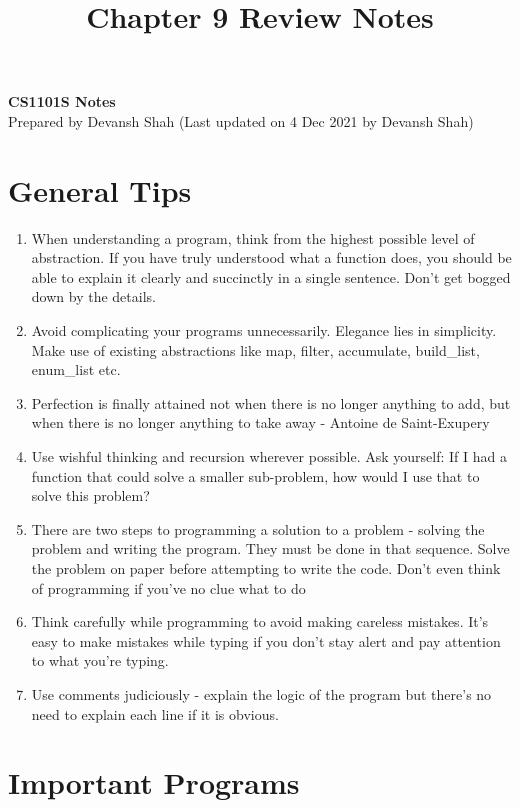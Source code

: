 \documentclass[11pt]{article}
\theoremstyle{definition}
\begin{document}
\renewcommand{\labelenumii}{\arabic{enumi}.\arabic{enumii}}
\renewcommand{\labelenumiii}{\arabic{enumi}.\arabic{enumii}.\arabic{enumiii}}
\renewcommand{\labelenumiv}{\arabic{enumi}.\arabic{enumii}.\arabic{enumiii}.\arabic{enumiv}}
\setcounter{section}{0}
\title{Chapter 9 Review Notes}
\newcommand{\code}{\fontfamily{pcr}\selectfont}
\thispagestyle{empty}

\begin{center}
{\LARGE \bf CS1101S Notes}\\
Prepared by Devansh Shah (Last updated on 4 Dec 2021 by Devansh Shah)
\end{center}
\section{General Tips}
\begin{enumerate}
    \item When understanding a program, think from the highest possible level of abstraction. If you have truly understood what a function does, you should be able to explain it clearly and succinctly in a single sentence. Don't get bogged down by the details.
    \item Avoid complicating your programs unnecessarily. Elegance lies in simplicity. Make use of existing abstractions like map, filter, accumulate, build\_list, enum\_list etc.
    \item Perfection is finally attained not when there is no longer anything to add, but when there is no longer anything to take away - Antoine de Saint-Exupery
    \item Use wishful thinking and recursion wherever possible. Ask yourself: If I had a function that could solve a smaller sub-problem, how would I use that to solve this problem?
    \item There are two steps to programming a solution to a problem - solving the problem and writing the program. They must be done in that sequence. Solve the problem on paper before attempting to write the code. Don't even think of programming if you've no clue what to do
    \item Think carefully while programming to avoid making careless mistakes. It's easy to make mistakes while typing if you don't stay alert and pay attention to what you're typing.
    \item Use comments judiciously - explain the logic of the program but there's no need to explain each line if it is obvious.
\end{enumerate}
\section{Important Programs}
\end{document}
